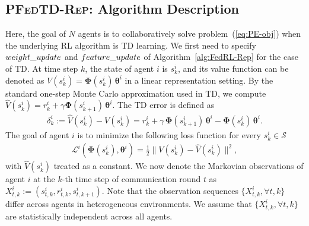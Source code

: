 \documentclass{article} %
\def\eqref#1{equation~\ref{#1}}
\theoremstyle{plain}
\theoremstyle{definition}
\theoremstyle{remark}
\renewcommand{\eqref}[1]{(\ref{#1})}
\newcommand{\cS}{\mathcal{S}}
\newcommand{\cL}{\mathcal{L}}
\newcommand{\FedTD}{\textsc{PFedTD-Rep}\xspace}
\begin{document}
\subsection{\FedTD: Algorithm Description}
Here, the goal of $N$ agents is to collaboratively solve problem~\eqref{eq:PE-obj} when the underlying RL algorithm is TD learning. We first need to specify $\textsc{weight\_update}$ and $\textsc{feature\_update}$ of Algorithm~\ref{alg:FedRL-Rep} for the case of TD. At time step $k$, the state of agent $i$ is $s_k^i$, and its value function can be denoted as $V(s_k^i)= \pmb{\Phi}(s_k^i) \, \pmb{\theta}^i$ in a linear representation setting. By the standard one-step Monte Carlo approximation used in TD, we compute $\hat{V}(s_k^i) = r_k^i+\gamma \pmb{\Phi}(s_{k+1}^i)\,\pmb{\theta}^i$. The TD error is defined as 
\begin{align}\label{eq:TD-error}
\delta_k^i:=\hat{V}(s_k^i)-V(s_k^i)=r_k^i+\gamma \, \pmb{\Phi}(s_{k+1}^i) \, \pmb{\theta}^i-\pmb{\Phi}(s_k^i)\,\pmb{\theta}^i.
\end{align}
The goal of agent $i$ is to minimize the following loss function for every $s_k^i\in\cS$
\begin{align}\label{eq:loss}
    \cL^i(\pmb{\Phi}(s_k^i), \pmb{\theta}^i)=\frac{1}{2}\bigl\|V(s_k^i)-\hat{V}(s_k^i)\bigr\|^2,
\end{align}
with $\hat{V}(s_k^i)$ treated as a constant. 
We now denote the Markovian observations of agent $i$ {at the $k$-th time step of communication round $t$} as $X_{t,k}^i:=(s_{t,k}^i, r_{t,k}^i, s_{t, k+1}^i)$. Note that the observation sequences $\{X_{t,k}^i, \forall t, k\}$ differ across agents in heterogeneous environments. We assume that $\{X_{t,k}^i, \forall t, k\}$ are statistically independent across all agents. 
\end{document}
